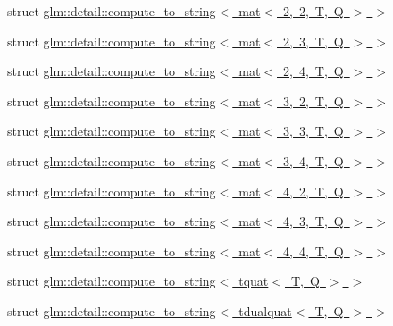 \begin{DoxyCompactItemize}
\item 
struct \mbox{\hyperlink{structglm_1_1detail_1_1compute__to__string_3_01mat_3_012_00_012_00_01_t_00_01_q_01_4_01_4}{glm\+::detail\+::compute\+\_\+to\+\_\+string$<$ mat$<$ 2, 2, T, Q $>$ $>$}}
\item 
struct \mbox{\hyperlink{structglm_1_1detail_1_1compute__to__string_3_01mat_3_012_00_013_00_01_t_00_01_q_01_4_01_4}{glm\+::detail\+::compute\+\_\+to\+\_\+string$<$ mat$<$ 2, 3, T, Q $>$ $>$}}
\item 
struct \mbox{\hyperlink{structglm_1_1detail_1_1compute__to__string_3_01mat_3_012_00_014_00_01_t_00_01_q_01_4_01_4}{glm\+::detail\+::compute\+\_\+to\+\_\+string$<$ mat$<$ 2, 4, T, Q $>$ $>$}}
\item 
struct \mbox{\hyperlink{structglm_1_1detail_1_1compute__to__string_3_01mat_3_013_00_012_00_01_t_00_01_q_01_4_01_4}{glm\+::detail\+::compute\+\_\+to\+\_\+string$<$ mat$<$ 3, 2, T, Q $>$ $>$}}
\item 
struct \mbox{\hyperlink{structglm_1_1detail_1_1compute__to__string_3_01mat_3_013_00_013_00_01_t_00_01_q_01_4_01_4}{glm\+::detail\+::compute\+\_\+to\+\_\+string$<$ mat$<$ 3, 3, T, Q $>$ $>$}}
\item 
struct \mbox{\hyperlink{structglm_1_1detail_1_1compute__to__string_3_01mat_3_013_00_014_00_01_t_00_01_q_01_4_01_4}{glm\+::detail\+::compute\+\_\+to\+\_\+string$<$ mat$<$ 3, 4, T, Q $>$ $>$}}
\item 
struct \mbox{\hyperlink{structglm_1_1detail_1_1compute__to__string_3_01mat_3_014_00_012_00_01_t_00_01_q_01_4_01_4}{glm\+::detail\+::compute\+\_\+to\+\_\+string$<$ mat$<$ 4, 2, T, Q $>$ $>$}}
\item 
struct \mbox{\hyperlink{structglm_1_1detail_1_1compute__to__string_3_01mat_3_014_00_013_00_01_t_00_01_q_01_4_01_4}{glm\+::detail\+::compute\+\_\+to\+\_\+string$<$ mat$<$ 4, 3, T, Q $>$ $>$}}
\item 
struct \mbox{\hyperlink{structglm_1_1detail_1_1compute__to__string_3_01mat_3_014_00_014_00_01_t_00_01_q_01_4_01_4}{glm\+::detail\+::compute\+\_\+to\+\_\+string$<$ mat$<$ 4, 4, T, Q $>$ $>$}}
\item 
struct \mbox{\hyperlink{structglm_1_1detail_1_1compute__to__string_3_01tquat_3_01_t_00_01_q_01_4_01_4}{glm\+::detail\+::compute\+\_\+to\+\_\+string$<$ tquat$<$ T, Q $>$ $>$}}
\item 
struct \mbox{\hyperlink{structglm_1_1detail_1_1compute__to__string_3_01tdualquat_3_01_t_00_01_q_01_4_01_4}{glm\+::detail\+::compute\+\_\+to\+\_\+string$<$ tdualquat$<$ T, Q $>$ $>$}}
\end{DoxyCompactItemize}
